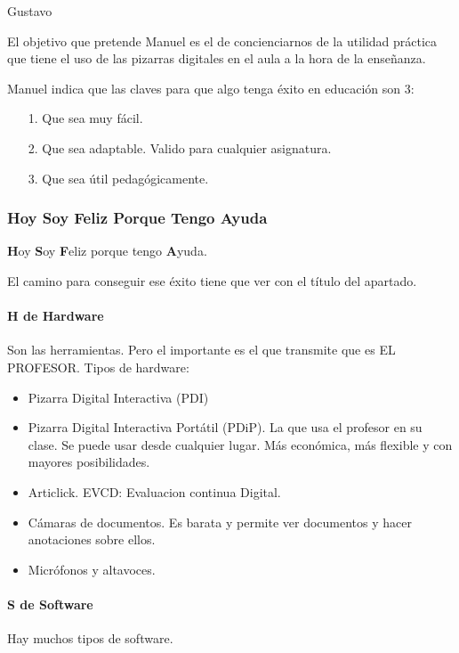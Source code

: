 \begin{opin}{\guscolor}{Gustavo}


El objetivo que pretende Manuel es el de concienciarnos de la utilidad práctica que tiene el uso de las pizarras digitales en el aula a la hora de la enseñanza.

Manuel indica que las claves para que algo tenga éxito en educación son 3:

\begin{itemize}
\item[1.]Que sea muy fácil. 
\item[2.]Que sea adaptable. Valido para cualquier asignatura. 
\item[3.]Que sea útil pedagógicamente. 
\end{itemize}

\subsubsection{Hoy Soy Feliz Porque Tengo Ayuda}

\textbf{H}oy \textbf{S}oy \textbf{F}eliz porque tengo \textbf{A}yuda.

El camino para conseguir ese éxito tiene que ver con el título del apartado.

\paragraph{H de Hardware}
Son las herramientas. Pero el importante es el que transmite que es EL PROFESOR. Tipos de hardware:

\begin{itemize}
\item Pizarra Digital Interactiva (PDI) 

\item Pizarra Digital Interactiva Portátil (PDiP). La que usa el profesor en su clase. Se puede usar desde cualquier lugar. Más económica, más flexible y con mayores posibilidades. 

\item Articlick. EVCD: Evaluacion continua Digital. 

\item Cámaras de documentos. Es barata y permite ver documentos y hacer anotaciones sobre ellos. 

\item Micrófonos y altavoces. 
\end{itemize}

\paragraph{S de Software}
Hay muchos tipos de software.


\end{opin}
